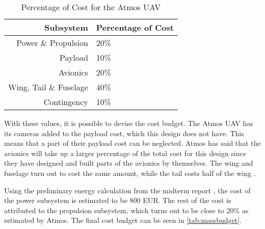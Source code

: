 \begin{table}[H]
    \centering
    \caption{Percentage of Cost for the Atmos UAV}
    \begin{tabular}{rl} \toprule
    \bfseries Subsystem &\bfseries Percentage of Cost \\\midrule
    Power \& Propulsion     &  20\% \\
    Payload     & 10\% \\
    Avionics & 20\% \\
    Wing, Tail \& Fuselage & 40\% \\
    Contingency & 10\% \\\bottomrule
    \end{tabular}

    \label{tab:costperc}
\end{table}

With these values, it is possible to devise the cost budget. The Atmos UAV has its cameras added to the payload cost, which this design does not have. This means that a part of their payload cost can be neglected. Atmos has said that the avionics will take up a larger percentage of the total cost for this design since they have designed and built parts of the avionics by themselves. The wing and fuselage turn out to cost the same amount, while the tail costs half of the wing \cite{costbreakdown}. 

Using the preliminary energy calculation from the midterm report \cite{midterm}, the cost of the power subsystem is estimated to be 800 EUR. The rest of the cost is attributed to the propulsion subsystem, which turns out to be close to 20\% as estimated by Atmos. The final cost budget can be seen in \autoref{tab:massbudget}.


